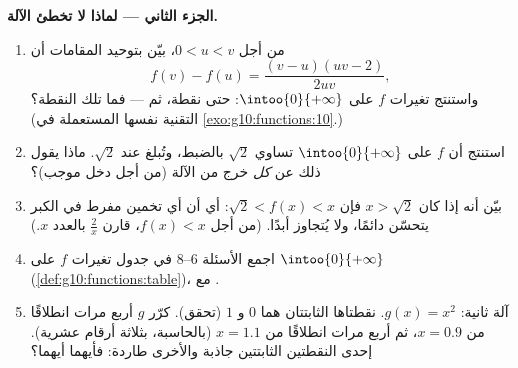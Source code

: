\begin{problem}
\medskip
\noindent\textbf{الجزء الثاني --- لماذا لا تخطئ الآلة.}
\begin{enumerate}[resume]
  \item من أجل $0 < u < v$، بيّن بتوحيد المقامات أن
        \[
        f(v) - f(u) = \frac{(v - u)(uv - 2)}{2uv} ,
        \]
        واستنتج تغيرات $f$ على
        $\intoo{0}{+\infty}$:  حتى نقطة، ثم
         --- فما تلك النقطة؟ (التقنية نفسها المستعملة في
        \cref{exo:g10:functions:10}.)
  \item استنتج أن  $f$ على $\intoo{0}{+\infty}$
         تساوي $\sqrt2$ بالضبط، وتُبلغ عند
        $\sqrt2$. ماذا يقول ذلك عن \emph{كل} خرج
        من الآلة (من أجل دخل موجب)؟
  \item بيّن أنه إذا كان $x > \sqrt2$ فإن
        $\sqrt2 < f(x) < x$: أي أن أي تخمين مفرط في الكبر يتحسّن دائمًا،
        ولا يُتجاوز أبدًا. (من أجل $f(x) < x$، قارن $\frac2x$
        بالعدد $x$.)
  \item اجمع الأسئلة 6--8 في جدول تغيرات $f$
        على $\intoo{0}{+\infty}$
        (\cref{def:g10:functions:table})، مع .
  \item آلة ثانية: $g(x) = x^2$. نقطتاها الثابتتان هما
        $0$ و $1$ (تحقق). كرّر $g$ أربع مرات انطلاقًا من
        $x = 0.9$، ثم أربع مرات انطلاقًا من $x = 1.1$ (بالحاسبة،
        بثلاثة أرقام عشرية). إحدى النقطتين الثابتتين جاذبة والأخرى
        طاردة: فأيهما أيهما؟
\end{enumerate}


\end{problem}

